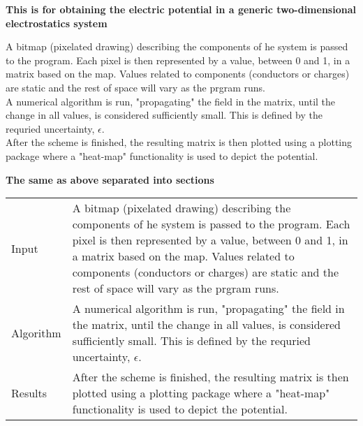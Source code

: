 \documentclass{article}
\begin{document}
  \noindent\textbf{This is for obtaining the electric potential in a generic two-dimensional electrostatics system}

  \vspace{5mm}

	A bitmap (pixelated drawing) describing the components of he system is passed to the program. Each pixel is then 
	 represented by a value, between 0 and 1, in a matrix based on the map. Values related to components (conductors 
	 or charges) are static and the rest of space will vary as the prgram runs. \\
	A numerical algorithm is run, "propagating" the field in the matrix, until the change in all values, is considered sufficiently
	 small. This is defined by the requried uncertainty, $\epsilon$. \\
	After the scheme is finished, the resulting matrix is then plotted using a plotting package where  a "heat-map" functionality
	 is used to depict the potential. 

\vspace{7.5mm}

\noindent\textbf{The same as above separated into sections}

\vspace{5mm}

  \begin{tabular}{ l p{10cm} }
	Input		&	A bitmap (pixelated drawing) describing the components of he system is passed to the program.
				 Each pixel is then represented by a value, between 0 and 1, in a matrix based on the map. 
				 Values related to components (conductors or charges) are static and the rest of space will vary
				  as the prgram runs. \\
	Algorithm	&	A numerical algorithm is run, "propagating" the field in the matrix, until the change in all values, 
 				  is considered sufficiently small. This is defined by the requried uncertainty, $\epsilon$. \\
	Results	&	After the scheme is finished, the resulting matrix is then plotted using a plotting package where
				  a "heat-map" functionality is used to depict the potential. 
  \end{tabular}
\end{document}
